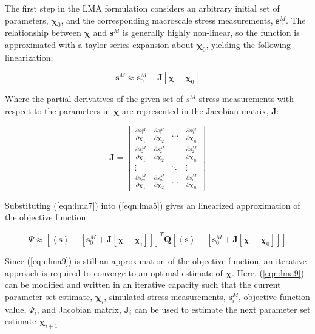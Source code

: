 The first step in the LMA formulation considers an arbitrary initial set of parameters, $\boldsymbol{\chi}_0$, and the corresponding macroscale stress measurements, $\mathbf{s}^M_0$. The relationship between $\boldsymbol{\chi}$ and $\mathbf{s}^M$ is generally highly non-linear, so the function is approximated with a taylor series expansion about $\boldsymbol{\chi}_0$, yielding the following linearization:

\begin{equation}
\mathbf{s}^M \approx \mathbf{s}^M_0 + \mathbf{J} \left[ \boldsymbol{\chi}-\boldsymbol{\chi}_0 \right]
\label{eqn:lma7}
\end{equation}

Where the partial derivatives of the given set of $s^M$ stress measurements with respect to the parameters in $\boldsymbol{\chi}$ are represented in the Jacobian matrix, $\mathbf{J}$: 

\begin{equation}
\mathbf{J}=\begin{bmatrix}
\frac{\partial s^M_1}{\partial \boldsymbol{\chi}_1} & \frac{\partial s^M_1}{\partial \boldsymbol{\chi}_2}     & \dots  & \frac{\partial s^M_1}{\partial \boldsymbol{\chi}_n}\\ 
\frac{\partial s^M_2}{\partial \boldsymbol{\chi}_1}     & \frac{\partial s^M_2}{\partial \boldsymbol{\chi}_2} &        & \frac{\partial s^M_2}{\partial \boldsymbol{\chi}_n}\\ 
\vdots&       & \ddots & \vdots \\ 
\frac{\partial s^M_m}{\partial \boldsymbol{\chi}_1}     & \frac{\partial s^M_m}{\partial \boldsymbol{\chi}_2}     & \dots  & \frac{\partial s^M_m}{\partial \boldsymbol{\chi}_n}
\end{bmatrix}
\label{eqn:lma8}
\end{equation}

Substituting (\ref{eqn:lma7}) into (\ref{eqn:lma5}) gives an linearized approximation of the objective function:

\begin{equation}
\Psi\approx\left[\left<\mathbf{s}\right>-\left[\mathbf{s}^M_0 + \mathbf{J} \left[ \boldsymbol{\chi}-\boldsymbol{\chi}_i \right] \right]\right]^T \mathbf{Q} \left[\left<\mathbf{s}\right>-\left[\mathbf{s}^M_0 + \mathbf{J} \left[ \boldsymbol{\chi}-\boldsymbol{\chi}_0 \right]\right]\right]
\label{eqn:lma9}
\end{equation}

Since (\ref{eqn:lma9}) is still an approximation of the objective function, an iterative approach is required to converge to an optimal estimate of $\boldsymbol{\chi}$. Here, (\ref{eqn:lma9}) can be modified and written in an iterative capacity such that the current parameter set estimate, $\boldsymbol{\chi}_i$, simulated stress measurements, $\mathbf{s}^M_i$, objective function value, $\Psi_i$, and Jacobian matrix, $\mathbf{J}_i$ can be used to estimate the next parameter set estimate $\boldsymbol{\chi}_{i+1}$:

